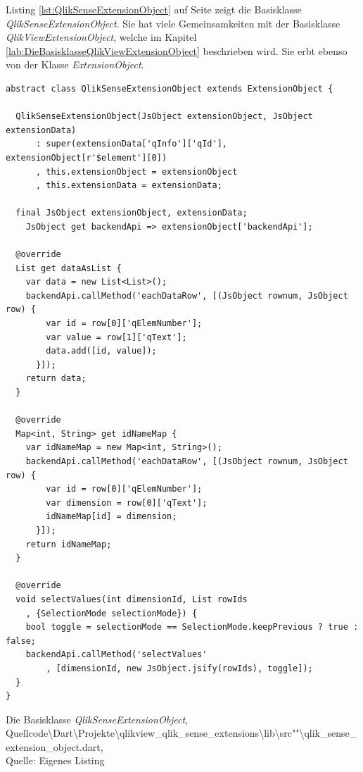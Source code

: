Listing \ref{lst:QlikSenseExtensionObject} auf Seite \pageref{lst:QlikSenseExtensionObject} zeigt die Basisklasse \textit{QlikSenseExtensionObject}. Sie hat viele Gemeinsam\-keiten mit der Basisklasse \textit{QlikViewExtensionObject}, welche im Kapitel \ref{lab:DieBasisklasseQlikViewExtensionObject} beschrieben wird. Sie erbt ebenso von der Klasse \textit{ExtensionObject}. 


\ifIncludeFigures\begin{listing}[htbp]
\begin{verbatim}
abstract class QlikSenseExtensionObject extends ExtensionObject {

  QlikSenseExtensionObject(JsObject extensionObject, JsObject extensionData)
      : super(extensionData['qInfo']['qId'], extensionObject[r'$element'][0])
      , this.extensionObject = extensionObject
      , this.extensionData = extensionData;
			
  final JsObject extensionObject, extensionData;
	JsObject get backendApi => extensionObject['backendApi'];
  
  @override
  List get dataAsList {
    var data = new List<List>();
    backendApi.callMethod('eachDataRow', [(JsObject rownum, JsObject row) {
        var id = row[0]['qElemNumber'];
        var value = row[1]['qText'];
        data.add([id, value]);
      }]);
    return data;
  }

  @override
  Map<int, String> get idNameMap {
    var idNameMap = new Map<int, String>();
    backendApi.callMethod('eachDataRow', [(JsObject rownum, JsObject row) {
        var id = row[0]['qElemNumber'];
        var dimension = row[0]['qText'];
        idNameMap[id] = dimension;
      }]);
    return idNameMap;
  }

  @override
  void selectValues(int dimensionId, List rowIds
    , {SelectionMode selectionMode}) {
    bool toggle = selectionMode == SelectionMode.keepPrevious ? true : false;
    backendApi.callMethod('selectValues'
        , [dimensionId, new JsObject.jsify(rowIds), toggle]);
  }
}
\end{verbatim}
\caption[Die Basisklasse \textit{QlikSenseExtensionObject}]{Die Basisklasse \textit{QlikSenseExtensionObject}, \\Quellcode\textbackslash{}Dart\textbackslash{}Projekte\textbackslash{}qlikview\_qlik\_sense\_extensions\textbackslash{}lib\textbackslash{}src""\textbackslash{}qlik\_sense\_extension\_object.dart, \\Quelle: Eigenes Listing}
\label{lst:QlikSenseExtensionObject}
\end{listing}\fi

